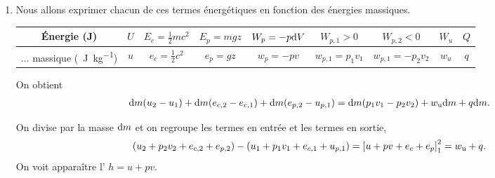 \documentclass[12pt,fancy]{cours}
\begin{document}
\begin{enumerate}
 \item 
Nous allons exprimer chacun de ces termes énergétiques en fonction des énergies massiques.
\begin{table}[h!]
  \centering
  \renewcommand{\arraystretch}{1.2}
  \begin{tabular}{|c|c| c| c| c| c| c| c| c|}
    \hline
    Énergie (J) & $U$ & $E_c=\frac{1}{2}mc^2$ & $E_p=mgz$ & $W_p=-p\mathrm{d} V$ & $W_{p,1}>0$ & $W_{p,2}<0$ & $W_u$ & $Q$ \\
    \hline
    ... massique (\SI{}{J.kg^{-1}}) & $u$ & $e_c = \frac{1}{2}c^2$ & $e_p=gz$ & $w_p=-pv$ & $w_{p,1}=p_1v_1$ &  $w_{p,1}=-p_2v_2$ & $w_u$ & $q$ \\
    \hline
  \end{tabular}
\end{table}

On obtient
  \begin{align}\label{eq:Ee_ouvert}
    \mathrm{d} m (u_2-u_1) +  \mathrm{d} m (e_{c,2}-e_{c,1}) + \mathrm{d} m(e_{p,2}-u_{p,1})  = \mathrm{d} m(p_1v_1-p_2v_2) + w_{\rm u} \mathrm{d} m + q \mathrm{d} m.
    \end{align}

On divise par la masse $\mathrm{d} m$ et on regroupe les termes en entrée et les termes en sortie,
\begin{equation}
(u_2 + p_2v_2 + e_{c,2} + e_{p,2}) - (u_1 + p_1 v_1 +e_{c,1} + u_{p,1})  = \left[u + pv + e_{c} + e_{p} \right]_1^2 =  w_{\rm u} + q.
\end{equation}
On voit apparaître l' $h = u+ pv$.
\end{enumerate}
\end{document}
